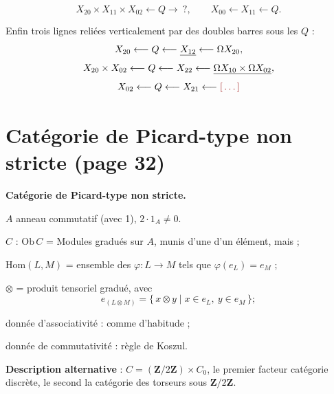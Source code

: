 \documentclass[11pt,a4paper]{article}
\begin{document}
\[
X_{20} \times X_{11} \times X_{02} \longleftarrow Q \longrightarrow\ ?,
\qquad
X_{00} \longleftarrow X_{11} \longleftarrow Q.
\]

Enfin trois lignes reliées verticalement par des doubles barres sous les
$Q$ :
\[
X_{20} \longleftarrow Q \longleftarrow \uncertain{X_{12}} \longleftarrow
\Omega X_{20},
\]
\[
X_{20} \times X_{02} \longleftarrow Q \longleftarrow X_{22} \longleftarrow
\uncertain{\Omega X_{10} \times \Omega X_{02}},
\]
\[
X_{02} \longleftarrow Q \longleftarrow X_{21} \longleftarrow \ill{}
\]

\section*{Catégorie de Picard-type non stricte (page 32)}

\textbf{Catégorie de Picard-type non stricte.}

$A$ anneau commutatif (avec 1), \struck{\ill} $2 \cdot 1_{A} \neq 0$.

$C$ : $\mathrm{Ob}\,C$ = Modules gradués  sur $A$, munis
d'une   d'un élément, mais
  ;

$\mathrm{Hom}(L,M)$ = ensemble des 
 $\varphi : L \to M$ tels que $\varphi(e_{L}) = e_{M}$ ;

$\otimes$ = produit tensoriel gradué, avec
\[
e_{(L \otimes M)} = \{\, x \otimes y \mid x \in e_{L},\ y \in e_{M} \,\} ;
\]

donnée d'associativité : comme d'habitude  ;

donnée de commutativité : règle de Koszul.

\textbf{Description alternative} : \struck{\ill} $C = (\mathbf{Z}/2\mathbf{Z})
\times C_{0}$, le premier facteur catégorie discrète, le second la catégorie
des torseurs sous $\mathbf{Z}/2\mathbf{Z}$.
\end{document}

